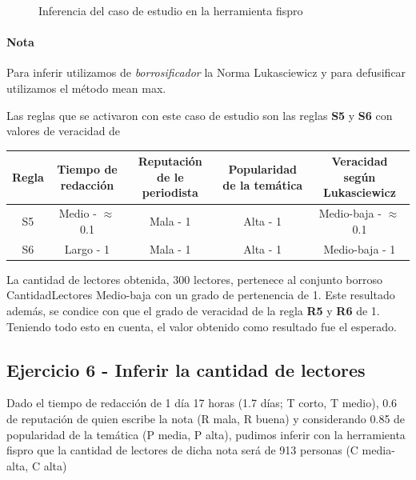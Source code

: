 \documentclass{article}
\begin{document}
\begin{figure}[H]
	\centering
	\caption{Inferencia del caso de estudio en la herramienta fispro}
\end{figure}

\paragraph{Nota} Para inferir utilizamos de \textit{borrosificador} la Norma Lukasciewicz
y para defusificar utilizamos el método mean max.

\vspace{3mm}
Las reglas que se activaron con este caso de estudio son las reglas \textbf{S5} y \textbf{S6} con valores de veracidad de

\begin{table}[H]
	\centering
	\begin{tabular}{c|c c c|c}
		Regla&Tiempo de redacción&Reputación de le periodista&Popularidad de la temática&Veracidad según Lukasciewicz\\
		\hline
		S5&Medio - $\approx$0.1&Mala - 1&Alta - 1&Medio-baja - $\approx$0.1\footnotemark\\
		S6&Largo - 1&Mala - 1&Alta - 1&Medio-baja - 1\footnotemark\\
	\end{tabular}
\end{table}


La cantidad de lectores obtenida, 300 lectores, pertenece al conjunto borroso CantidadLectores Medio-baja con un grado de pertenencia de 1. Este resultado además, se condice con que el grado de veracidad de la regla \textbf{R5} y \textbf{R6} de 1. Teniendo todo esto en cuenta, el valor obtenido como resultado fue el esperado.

\pagebreak
\subsection*{Ejercicio 6 - Inferir la cantidad de lectores}

Dado el tiempo de redacción de 1 día 17 horas (1.7 días; T corto, T medio), 0.6 de reputación de quien escribe la nota (R mala, R buena) y considerando 0.85 de popularidad de la temática (P media, P alta), pudimos inferir con la herramienta fispro que la cantidad de lectores de dicha nota será de 913 personas (C media-alta, C alta)
\end{document}
